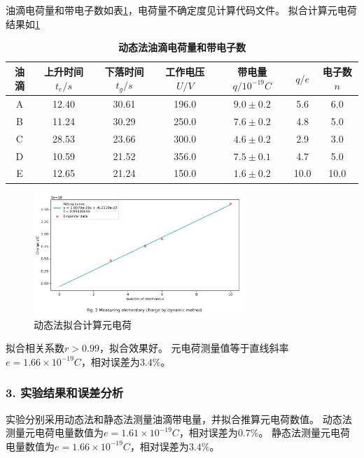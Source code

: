\documentclass[12pt,a4paper,UTF8]{ctexart}
\begin{document}
    油滴电荷量和带电子数如表\ref{tab:2.1}，电荷量不确定度见计算代码文件。
    拟合计算元电荷结果如\ref{fig:2}
    \begin{table}[htbp]
        \centering
            \begin{tabular}{ccccccc}
                \toprule
                油滴    &上升时间$t_e /s$   &下落时间$t_g /s$	&工作电压$U/V$    &带电量$q/10^{-19}C$ &$q/e$  &电子数$n$  \\
                \midrule
                A   &12.40   &30.61 &196.0	&$9.0 \pm 0.2$  &5.6   &6.0   \\
                B   &11.24   &30.29	&250.0	&$7.6 \pm 0.2$  &4.8   &5.0   \\
                C   &28.53   &23.66	&300.0	&$4.6 \pm 0.2$  &2.9   &3.0   \\
                D   &10.59   &21.52	&356.0	&$7.5 \pm 0.1$  &4.7   &5.0   \\
                E   &12.65   &21.24	&150.0	&$1.6 \pm 0.2$  &10.0   &10.0   \\
                \bottomrule
            \end{tabular}
            \caption{\textbf{动态法油滴电荷量和带电子数}}
            \label{tab:2.1}
    \end{table}

    \begin{figure}[htbp]
        \centering
        \includegraphics[width=0.7\textwidth]{attachments/fig.2.png}
        \caption{动态法拟合计算元电荷}
        \label{fig:2}
    \end{figure}

    拟合相关系数$r>0.99$，拟合效果好。
    元电荷测量值等于直线斜率$e = 1.66 \times 10^{-19} C$，相对误差为$3.4\%$。
    
    \subsubsection*{3. 实验结果和误差分析}
    实验分别采用动态法和静态法测量油滴带电量，并拟合推算元电荷数值。
    动态法测量元电荷电量数值为$e = 1.61 \times 10^{-19} C$，相对误差为$0.7\%$。
    静态法测量元电荷电量数值为$e = 1.66 \times 10^{-19} C$，相对误差为$3.4\%$。
    
\end{document}
